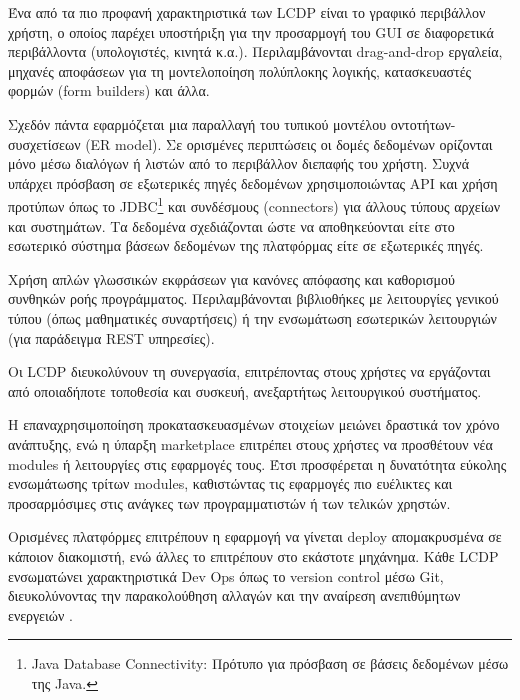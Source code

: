             \begin{description}
                \setlength\itemsep{-0.25em}
                \item[Γραφικός σχεδιαστής (GUI Designer) --] Ένα από τα πιο προφανή χαρακτηριστικά των LCDP είναι το γραφικό περιβάλλον χρήστη, ο οποίος παρέχει υποστήριξη για την προσαρμογή του GUI σε διαφορετικά περιβάλλοντα (υπολογιστές, κινητά κ.α.). Περιλαμβάνονται drag-and-drop εργαλεία, μηχανές αποφάσεων για τη μοντελοποίηση πολύπλοκης λογικής, κατασκευαστές φορμών (form builders) και άλλα.
                \item[Μοντελοποίηση δομών δεδομένων --] Σχεδόν πάντα εφαρμόζεται μια παραλλαγή του τυπικού μοντέλου οντοτήτων-συσχετίσεων (ER model). Σε ορισμένες περιπτώσεις οι δομές δεδομένων ορίζονται μόνο μέσω διαλόγων ή λιστών από το περιβάλλον διεπαφής του χρήστη. Συχνά υπάρχει πρόσβαση σε εξωτερικές πηγές δεδομένων χρησιμοποιώντας API και χρήση προτύπων όπως το JDBC\footnote{Java Database Connectivity: Πρότυπο για πρόσβαση σε βάσεις δεδομένων μέσω της Java.} και συνδέσμους (connectors) για άλλους τύπους αρχείων και συστημάτων. Τα δεδομένα σχεδιάζονται ώστε να αποθηκεύονται είτε στο εσωτερικό σύστημα βάσεων δεδομένων της πλατφόρμας είτε σε εξωτερικές πηγές.
                \item[Ροή προγράμματος --] Χρήση απλών γλωσσικών εκφράσεων για κανόνες απόφασης και καθορισμού συνθηκών ροής προγράμματος. Περιλαμβάνονται βιβλιοθήκες με λειτουργίες γενικού τύπου (όπως μαθηματικές συναρτήσεις) ή την ενσωμάτωση εσωτερικών λειτουργιών (για παράδειγμα REST υπηρεσίες).
                \item[Φορητότητα και συνεργασία --] Οι LCDP διευκολύνουν τη συνεργασία, επιτρέποντας στους χρήστες να εργάζονται από οποιαδήποτε τοποθεσία και συσκευή, ανεξαρτήτως λειτουργικού συστήματος.
                \item[Επεκτασιμότητα --] Η επαναχρησιμοποίηση προκατασκευασμένων στοιχείων μειώνει δραστικά τον χρόνο ανάπτυξης, ενώ η ύπαρξη marketplace επιτρέπει στους χρήστες να προσθέτουν νέα modules ή λειτουργίες στις εφαρμογές τους. Έτσι προσφέρεται η δυνατότητα εύκολης ενσωμάτωσης τρίτων modules, καθιστώντας τις εφαρμογές πιο ευέλικτες και προσαρμόσιμες στις ανάγκες των προγραμματιστών ή των τελικών χρηστών.
                \item[Εύκολη διάθεση και έλεγχος έκδοσης --] Ορισμένες πλατφόρμες επιτρέπουν η εφαρμογή να γίνεται deploy απομακρυσμένα σε κάποιον διακομιστή, ενώ άλλες το επιτρέπουν στο εκάστοτε μηχάνημα. Κάθε LCDP ενσωματώνει χαρακτηριστικά Dev Ops όπως το version control μέσω Git, διευκολύνοντας την παρακολούθηση αλλαγών και την αναίρεση ανεπιθύμητων ενεργειών \cite{Bock2021}.
            \end{description}

